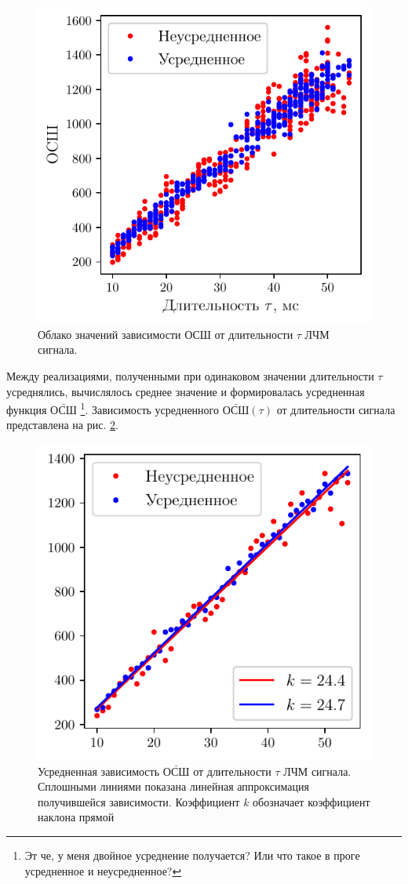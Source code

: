 \begin{figure}[h!]
    \centering
    \includegraphics[width=0.6\linewidth]{imgs/task4/t4f1}
    \caption{Облако значений зависимости ОСШ от длительности $\tau$ ЛЧМ сигнала.} \label{fig:4.1}
\end{figure}


\newcommand{\mSNR}{\bar{\text{ОСШ}}}
Между реализациями, полученными при одинаковом значении длительности $\tau$
усреднялись, вычислялось среднее значение и формировалась усредненная функция
$\mSNR$ \footnote{Эт че, у меня двойное усреднение получается? Или
что такое в проге усредненное и неусредненное?}. Зависимость усредненного 
$\mSNR(\tau)$ от длительности сигнала представлена на рис. \ref{fig:4.2}.

\begin{figure}[h!]
    \centering
    \includegraphics[width=0.6\linewidth]{imgs/task4/t4f2}
    \caption{Усредненная зависимость $\mSNR$ от длительности $\tau$ ЛЧМ сигнала. Сплошными линиями показана линейная
аппроксимация получившейся зависимости. Коэффициент $k$ обозначает коэффициент
наклона прямой}
    \label{fig:4.2}
\end{figure}

